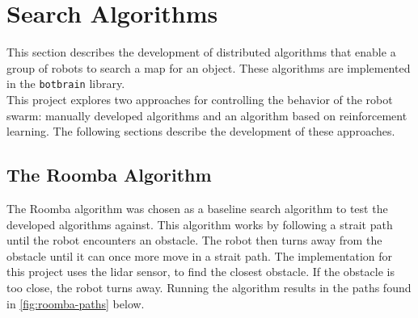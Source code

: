 
\section{Search Algorithms}
This section describes the development of distributed algorithms that enable a group of robots to search a map for an object. These algorithms are implemented in the \texttt{botbrain} library. \\

This project explores two approaches for controlling the behavior of the robot swarm: manually developed algorithms and an algorithm based on reinforcement learning. The following sections describe the development of these approaches.

\subsection{The {\color{red}Roomba} Algorithm}
The Roomba algorithm was chosen as a baseline search algorithm to test the developed algorithms against. This algorithm works by following a strait path until the robot encounters an obstacle. The robot then turns away from the obstacle until it can once more move in a strait path. The implementation for this project uses the lidar sensor, to find the closest obstacle. If the obstacle is too close, the robot turns away. Running the algorithm results in the paths found in \cref{fig:roomba-paths} below.

